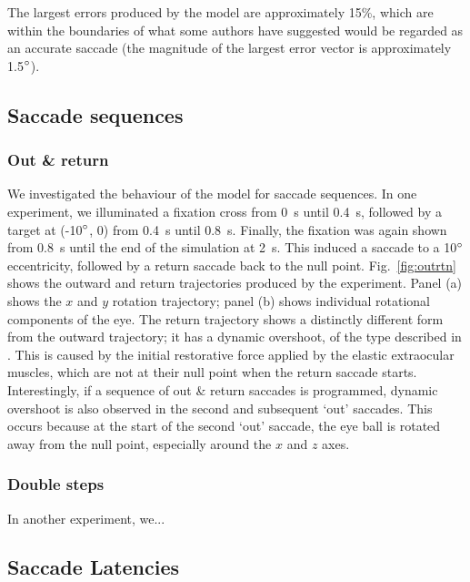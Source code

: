 \documentclass{frontiersSCNS}
\begin{document}
The largest errors produced by the model are approximately 15\%, which are
within the boundaries of what some authors have suggested would be regarded
as an accurate saccade \cite{mcpeek_saccade_2002,mcpeek_incomplete_2006}
(the magnitude of the largest error vector is approximately 1.5$\degree$). 


\subsection{Saccade sequences}

\subsubsection{Out \& return}

We investigated the behaviour of the model for saccade sequences.
In one experiment, we illuminated a fixation
cross from 0~s until 0.4~s, followed by a target at (-10$\degree$, 0)
from 0.4~s until 0.8~s. Finally, the fixation was again shown from 0.8~s
until the end of the simulation at 2~s. This induced a saccade to a
10$\degree$ eccentricity, followed by a return saccade back to the
null point. Fig.~\ref{fig:outrtn} shows the
outward and return trajectories produced by the experiment. Panel (a) 
shows the $x$ and $y$ rotation trajectory; panel (b) shows individual
rotational components of the eye. The return trajectory shows a 
distinctly different form from the outward trajectory; it has a dynamic
overshoot, of the type described in \cite{bahill_trajectories_1979}.
This is caused by the initial restorative force applied by the elastic
extraocular muscles, which are not at their null point when the return
saccade starts. Interestingly, if a sequence of out \& return saccades is
programmed, dynamic overshoot is also observed in the second and
subsequent `out' saccades. This occurs because at the start of the 
second `out' saccade, the eye ball is rotated away from the null point,
especially around the $x$ and $z$ axes.

\subsubsection{Double steps}

In another experiment, we...

\subsection{Saccade Latencies}
\end{document}
